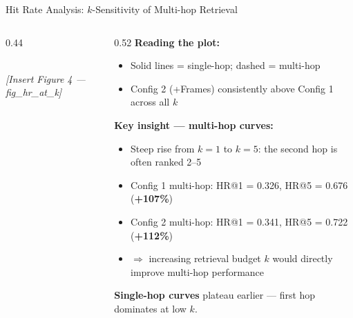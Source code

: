 \documentclass[aspectratio=169,t]{beamer}
\begin{document}
\begin{frame}{Hit Rate Analysis: $k$-Sensitivity of Multi-hop Retrieval}

\begin{columns}[T]
\begin{column}{0.44\textwidth}
  \begin{center}
  \fbox{\rule{0pt}{5.0cm}\rule{4.8cm}{0pt}}\\
  \footnotesize\textit{[Insert Figure 4 — fig\_hr\_at\_k]}
  \end{center}
\end{column}
\begin{column}{0.52\textwidth}
  \textbf{Reading the plot:}
  \begin{itemize}
    \item Solid lines = single-hop; dashed = multi-hop
    \item Config 2 (+Frames) consistently above Config 1 across all $k$
  \end{itemize}

  \medskip
  \textbf{Key insight — multi-hop curves:}
  \begin{itemize}
    \item Steep rise from $k{=}1$ to $k{=}5$: the second hop is often ranked 2--5
    \item Config 1 multi-hop: HR@1 = 0.326, HR@5 = 0.676 (\textbf{+107\%})
    \item Config 2 multi-hop: HR@1 = 0.341, HR@5 = 0.722 (\textbf{+112\%})
    \item $\Rightarrow$ increasing retrieval budget $k$ would directly improve multi-hop performance
  \end{itemize}

  \medskip
  \textbf{Single-hop curves} plateau earlier — first hop dominates at low $k$.
\end{column}
\end{columns}

\end{frame}
\end{document}
